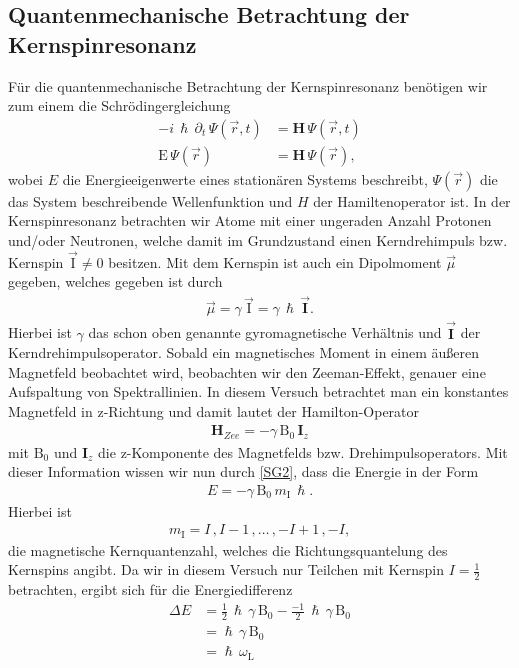 \documentclass[10pt,twoside]{article}
\renewcommand{\1}{^{-1}}
\renewcommand{\2}{^{-2}}
\newcommand{\3}{^{-3}}
\newcommand{\4}{^{-4}}
\newcommand{\5}{^{-5}}
\newcommand{\6}{^{-6}}
\newcommand{\7}{^{-7}}
\newcommand{\8}{^{-8}}
\newcommand{\9}{^{-9}}
\begin{document}
\subsection{Quantenmechanische Betrachtung der Kernspinresonanz}

Für die quantenmechanische Betrachtung der Kernspinresonanz benötigen wir zum einem die Schrödingergleichung
\begin{align}
-i\,\hslash\,\partial_t\,\Psi(\vec{r},t) &= \textbf{H}\,\Psi(\vec{r},t) \tag{SG1} \\
\text{E}\,\Psi(\vec{r}) &= \textbf{H}\,\Psi(\vec{r}) \tag{SG2}{,}
\label{SG2}
\end{align} 
wobei $E$ die Energieeigenwerte eines stationären Systems beschreibt, 
$\Psi(\vec{r})$ die das System beschreibende Wellenfunktion und $H$ der Hamiltenoperator ist.
In der Kernspinresonanz betrachten wir Atome mit einer ungeraden Anzahl Protonen und/oder Neutronen, 
welche damit im Grundzustand einen Kerndrehimpuls bzw. Kernspin $\vec{\text{I}} \neq 0$ besitzen. 
Mit dem Kernspin ist auch ein Dipolmoment $\vec{\mu}$ gegeben, 
welches gegeben ist durch
\begin{align*}
\vec{\mu} = \gamma\,\vec{\text{I}}=\gamma\,\hslash\,\vec{\textbf{I}}{.}
\end{align*}
Hierbei ist $\gamma$ das schon oben genannte gyromagnetische Verhältnis und $\vec{\textbf{I}}$ der 
Kerndrehimpulsoperator. 
Sobald ein magnetisches Moment in einem äußeren Magnetfeld beobachtet wird, beobachten wir den Zeeman-Effekt, 
genauer eine Aufspaltung von Spektrallinien. In diesem Versuch betrachtet man ein konstantes Magnetfeld in z-Richtung und damit lautet der Hamilton-Operator 
\begin{align*}
\textbf{H}_{Zee} = -\gamma\,\text{B}_0\,\textbf{I}_z
\end{align*}
mit $\text{B}_0$ und $\textbf{I}_z$ die z-Komponente des Magnetfelds bzw. Drehimpulsoperators. 
Mit dieser Information wissen wir nun durch \ref{SG2}, dass die Energie in der Form
\begin{align*}
E = -\gamma\,\text{B}_0\,m_{\text{I}}\,\hslash{.}
\end{align*}
Hierbei ist
\begin{align*}
m_{\text{I}} = I\,{,}I-1\,{,} \ldots \,{,} -I+1\,{,}-I {,}
\end{align*}
die magnetische Kernquantenzahl, welches die Richtungsquantelung des Kernspins angibt.
Da wir in diesem Versuch nur Teilchen mit Kernspin $I=\frac{1}{2}$ betrachten, ergibt sich für die Energiedifferenz
\begin{align*}
\Delta E &= \frac{1}{2}\,\hslash\,\gamma\,\text{B}_0 - \frac{-1}{2}\,\hslash\,\gamma\,\text{B}_0 \\
&= \hslash\,\gamma\,\text{B}_0 \\
&= \hslash\,\omega_{\text{L}}
\end{align*}
\end{document}
